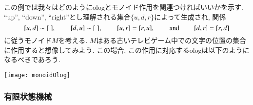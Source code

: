 \begin{example}\label{ex:monoid as olog}


この例では我々はどのようにologとモノイド作用を関連つければいいかを示す. ``up'', ``down'', ``right''とし理解される集合$\{u,d,r\}$によって生成され, 関係$$[u,d]\sim[\;],\hsp[d,u]\sim[\;],\hsp[u,r]=[r,u],\hsp \tn{and}\hsp [d,r]=[r,d]$$に従うモノイド$M$を考える.
$M$はある古いテレビゲーム中での文字の位置の集合に作用すると想像してみよう. この場合, この作用に対応するologは以下のようになるべきであろう.
\begin{center}
\texttt{[image: monoidOlog]}
\end{center}

\end{example}


\subsubsection{有限状態機械}\label{sec:FSMs}



